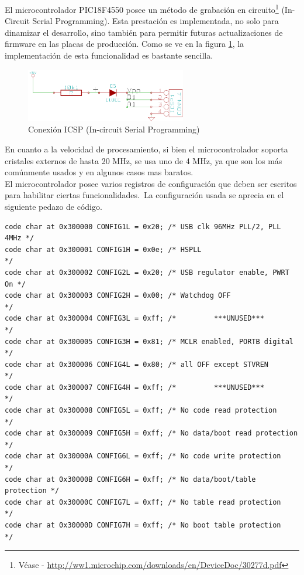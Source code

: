 El microcontrolador PIC18F4550 posee un m\'etodo de grabaci\'on en
circuito\footnote{V\'ease -
\url{http://ww1.microchip.com/downloads/en/DeviceDoc/30277d.pdf}} (In-Circuit
Serial Programming). Esta prestaci\'on es implementada, no solo para dinamizar
el desarrollo, sino tambi\'en para permitir futuras actualizaciones de firmware
en las placas de producci\'on. Como se ve en la figura \ref{fig:icsp}, la
implementaci\'on de esta funcionalidad es bastante sencilla.\\

\begin{figure}[htp]
\centering
\includegraphics[width=7cm]{./img/icsp.png}
\caption{Conexi\'on ICSP (In-circuit Serial Programming)}
\label{fig:icsp}
\end{figure}

En cuanto a la velocidad de procesamiento, si bien el microcontrolador soporta
cristales externos de hasta 20 MHz, se usa uno de 4 MHz, ya que son los m\'as
com\'unmente usados y en algunos casos mas baratos.\\

El microcontrolador posee varios registros de configuraci\'on que deben ser
escritos para habilitar ciertas funcionalidades.\
La configuraci\'on usada se aprecia en el siguiente pedazo de c\'odigo.

\begin{lstlisting}
code char at 0x300000 CONFIG1L = 0x20; /* USB clk 96MHz PLL/2, PLL 4MHz */
code char at 0x300001 CONFIG1H = 0x0e; /* HSPLL                         */
code char at 0x300002 CONFIG2L = 0x20; /* USB regulator enable, PWRT On */
code char at 0x300003 CONFIG2H = 0x00; /* Watchdog OFF                  */
code char at 0x300004 CONFIG3L = 0xff; /*         ***UNUSED***          */
code char at 0x300005 CONFIG3H = 0x81; /* MCLR enabled, PORTB digital   */
code char at 0x300006 CONFIG4L = 0x80; /* all OFF except STVREN         */
code char at 0x300007 CONFIG4H = 0xff; /*         ***UNUSED***          */
code char at 0x300008 CONFIG5L = 0xff; /* No code read protection       */
code char at 0x300009 CONFIG5H = 0xff; /* No data/boot read protection  */
code char at 0x30000A CONFIG6L = 0xff; /* No code write protection      */
code char at 0x30000B CONFIG6H = 0xff; /* No data/boot/table protection */
code char at 0x30000C CONFIG7L = 0xff; /* No table read protection      */
code char at 0x30000D CONFIG7H = 0xff; /* No boot table protection      */
\end{lstlisting}


